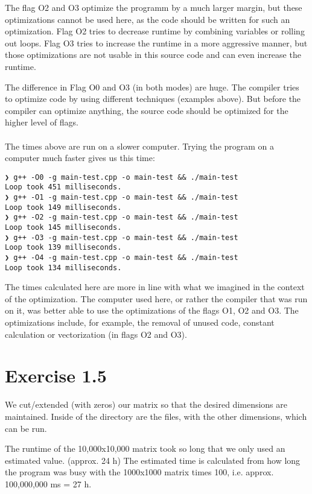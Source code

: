 \documentclass[a4paper]{article}
\begin{document}
The flag O2 and O3 optimize the programm by a much larger margin, but these optimizations cannot be used here, as the code should be written for such an optimization. Flag O2 tries to decrease runtime by combining variables or rolling out loops. Flag O3 tries to increase the runtime in a more aggressive manner, but those optimizations are not usable in this source code and can even increase the runtime.

The difference in Flag O0 and O3 (in both modes) are huge. The compiler tries to optimize code by using different techniques (examples above). But before the compiler can optimize anything, the source code should be optimized for the higher level of flags. \\ \\
The times above are run on a slower computer. Trying the program on a computer much faster gives us this time:
\begin{lstlisting}[caption={"test on a different machine
"}]
❯ g++ -O0 -g main-test.cpp -o main-test && ./main-test
Loop took 451 milliseconds.
❯ g++ -O1 -g main-test.cpp -o main-test && ./main-test
Loop took 149 milliseconds.
❯ g++ -O2 -g main-test.cpp -o main-test && ./main-test
Loop took 145 milliseconds.
❯ g++ -O3 -g main-test.cpp -o main-test && ./main-test
Loop took 139 milliseconds.
❯ g++ -O4 -g main-test.cpp -o main-test && ./main-test
Loop took 134 milliseconds.
\end{lstlisting}

The times calculated here are more in line with what we imagined in the context of the optimization. The computer used here, or rather the compiler that was run on it, was better able to use the optimizations of the flags O1, O2 and O3. The optimizations include, for example, the removal of unused code, constant calculation or vectorization (in flags O2 and O3).


\section*{Exercise 1.5}

We cut/extended (with zeros) our matrix so that the desired dimensions are maintained. Inside of the directory are the files, with the other dimensions, which can be run.
\begin{center}
\end{center}

The runtime of the 10,000x10,000 matrix took so long that we only used an estimated value. (approx. 24 h) 
The estimated time is calculated from how long the program was busy with the 1000x1000 matrix times 100, i.e. approx. 100,000,000 ms = 27 h.
\end{document}
